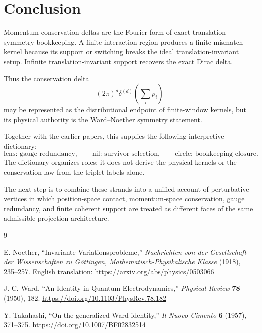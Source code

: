 \documentclass[11pt]{article}
\begin{document}
\section{Conclusion}

Momentum-conservation deltas are the Fourier form of exact translation-symmetry bookkeeping.
A finite interaction region produces a finite mismatch kernel because its support or switching
breaks the ideal translation-invariant setup.  Infinite translation-invariant support recovers
the exact Dirac delta.

Thus the conservation delta
\[
(2\pi)^d\delta^{(d)}\left(\sum_i p_i\right)
\]
may be represented as the distributional endpoint of finite-window kernels, but its physical
authority is the Ward--Noether symmetry statement.

Together with the earlier papers, this supplies the following interpretive dictionary:
\[
\text{lens: gauge redundancy},
\qquad
\text{nil: survivor selection},
\qquad
\text{circle: bookkeeping closure}.
\]
The dictionary organizes roles; it does not derive the physical kernels or the conservation
law from the triplet labels alone.

The next step is to combine these strands into a unified account of perturbative vertices in which position-space contact, momentum-space conservation, gauge redundancy, and finite coherent support are treated as different faces of the same admissible projection architecture.

\begin{thebibliography}{9}

E. Noether,
``Invariante Variationsprobleme,''
\emph{Nachrichten von der Gesellschaft der Wissenschaften zu G\"ottingen,
Mathematisch-Physikalische Klasse} (1918), 235--257.
English translation: \url{https://arxiv.org/abs/physics/0503066}

J. C. Ward,
``An Identity in Quantum Electrodynamics,''
\emph{Physical Review} \textbf{78} (1950), 182.
\url{https://doi.org/10.1103/PhysRev.78.182}

Y. Takahashi,
``On the generalized Ward identity,''
\emph{Il Nuovo Cimento} \textbf{6} (1957), 371--375.
\url{https://doi.org/10.1007/BF02832514}

\end{thebibliography}
\end{document}
